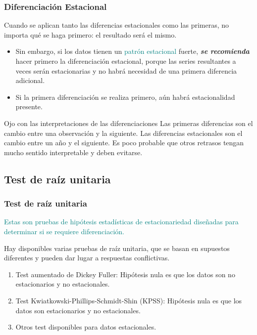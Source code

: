 \documentclass[10pt]{beamer}
\begin{document}
\begin{frame}[fragile]
\frametitle{Diferenciación Estacional}

Cuando se aplican tanto las diferencias estacionales como las primeras, no importa qué se haga primero: el resultado será el mismo. 

\vspace{3mm}

{\small
\begin{itemize}
\item Sin embargo, si los datos tienen un \textcolor{teal}{patrón estacional} fuerte, \textbf{\textit{se recomienda}} hacer primero la diferenciación estacional, porque las series resultantes a veces serán estacionarias y no habrá necesidad de una primera diferencia adicional. 

\item Si la primera diferenciación se realiza primero, aún habrá estacionalidad presente.
\end{itemize}
}

\vspace{3mm}
\pause

{\small
\begin{block}{Ojo con las interpretaciones de las diferenciaciones}
Las primeras diferencias son el cambio entre una observación y la siguiente. Las diferencias estacionales son el cambio entre un año y el siguiente. Es poco probable que otros retrasos tengan mucho sentido interpretable y deben evitarse.
\end{block}
}
\end{frame}





\subsection{Test de raíz unitaria}


\begin{frame}[fragile]
\frametitle{Test de raíz unitaria}

\textcolor{teal}{Estas son pruebas de hipótesis estadísticas de estacionariedad diseñadas para determinar si se requiere diferenciación.}

\vspace{3mm}

Hay disponibles varias pruebas de raíz unitaria, que se basan en supuestos diferentes y pueden dar lugar a respuestas conflictivas.


\begin{enumerate}
\item Test aumentado de Dickey Fuller: Hipótesis nula es que los datos son no estacionarios y no estacionales.

\item Test Kwiatkowski-Phillips-Schmidt-Shin (KPSS): Hipótesis nula es que los datos son estacionarios y no estacionales.

\item Otros test disponibles para datos estacionales.
\end{enumerate}

\end{frame}
\end{document}
